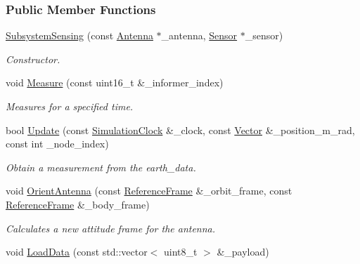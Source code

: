 \subsubsection*{Public Member Functions}
\begin{DoxyCompactItemize}
\item 
\hyperlink{classosse_1_1collaborate_1_1_subsystem_sensing_a86a15f70b159a115f6682a795cba3b13}{Subsystem\+Sensing} (const \hyperlink{classosse_1_1collaborate_1_1_antenna}{Antenna} $\ast$\+\_\+antenna, \hyperlink{classosse_1_1collaborate_1_1_sensor}{Sensor} $\ast$\+\_\+sensor)
\begin{DoxyCompactList}\small\item\em Constructor. \end{DoxyCompactList}\item 
void \hyperlink{classosse_1_1collaborate_1_1_subsystem_sensing_a7ab0187c0ebdf98d98190c5cbeff49b2}{Measure} (const uint16\+\_\+t \&\+\_\+informer\+\_\+index)
\begin{DoxyCompactList}\small\item\em Measures for a specified time. \end{DoxyCompactList}\item 
bool \hyperlink{classosse_1_1collaborate_1_1_subsystem_sensing_aa2e63167e5a5fc6c646febeb263a4b22}{Update} (const \hyperlink{classosse_1_1collaborate_1_1_simulation_clock}{Simulation\+Clock} \&\+\_\+clock, const \hyperlink{classosse_1_1collaborate_1_1_vector}{Vector} \&\+\_\+position\+\_\+m\+\_\+rad, const int \+\_\+node\+\_\+index)
\begin{DoxyCompactList}\small\item\em Obtain a measurement from the earth\+\_\+data. \end{DoxyCompactList}\item 
void \hyperlink{classosse_1_1collaborate_1_1_subsystem_sensing_abd60540872a1fad85bf8ec99e82f1e4d}{Orient\+Antenna} (const \hyperlink{classosse_1_1collaborate_1_1_reference_frame}{Reference\+Frame} \&\+\_\+orbit\+\_\+frame, const \hyperlink{classosse_1_1collaborate_1_1_reference_frame}{Reference\+Frame} \&\+\_\+body\+\_\+frame)
\begin{DoxyCompactList}\small\item\em Calculates a new attitude frame for the antenna. \end{DoxyCompactList}\item 
void \hyperlink{classosse_1_1collaborate_1_1_subsystem_sensing_aca7bea84c4184675d161c698ec0318a9}{Load\+Data} (const std\+::vector$<$ uint8\+\_\+t $>$ \&\+\_\+payload)

\end{DoxyCompactItemize}
